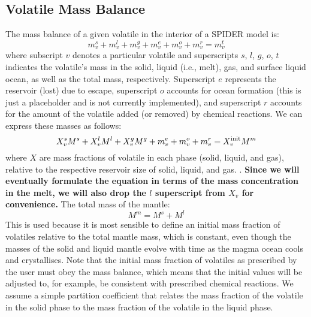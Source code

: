 
\noindent {}

\subsection{Volatile Mass Balance}
The mass balance of a given volatile in the interior of a SPIDER model \citep[e.g.,][]{LMC13} is:
\begin{equation}
m_v^s + m_v^l + m_v^g + m_v^e + m_v^o + m_v^r= m_v^t
\end{equation}
where subscript $v$ denotes a particular volatile and superscripts $s$, $l$, $g$, $o$, $t$ indicates the volatile's mass in the solid, liquid (i.e., melt), gas, and surface liquid ocean, as well as the total mass, respectively.  Superscript $e$ represents the reservoir (lost) due to escape, superscript $o$ accounts for ocean formation (this is just a placeholder and is not currently implemented), and superscript $r$ accounts for the amount of the volatile added (or removed) by chemical reactions.  We can express these masses as follows:
\begin{equation}
X_v^s M^s + X_v^l M^l + X_v^g M^g + m_v^e + m_v^o + m_v^r = X_v^{\rm init} M^m
\end{equation}
where $X$ are mass fractions of volatile in each phase (solid, liquid, and gas), relative to the respective  reservoir size of solid, liquid, and gas.  .  \textbf{Since we will eventually formulate the equation in terms of the mass concentration in the melt, we will also drop the $l$ superscript from $X_v$ for convenience.} The total mass of the mantle:
\begin{equation}
M^m = M^s + M^l
\end{equation}
This is used because it is most sensible to define an initial mass fraction of volatiles relative to the total mantle mass, which is constant, even though the masses of the solid and liquid mantle evolve with time as the magma ocean cools and crystallises.  Note that the initial mass fraction of volatiles as prescribed by the user must obey the mass balance, which means that the initial values will be adjusted to, for example, be consistent with prescribed chemical reactions.  We assume a simple partition coefficient that relates the mass fraction of the volatile in the solid phase to the mass fraction of the volatile in the liquid phase.
